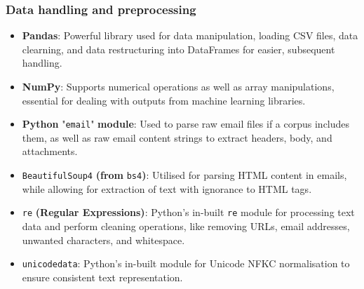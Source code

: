 
\subsubsection*{Data handling and preprocessing}

\begin{itemize}
  \item \textbf{Pandas}: Powerful library used for data manipulation, loading CSV files, data clearning, and data restructuring into DataFrames for easier, subsequent handling.
  \item \textbf{NumPy}: Supports numerical operations as well as array manipulations, essential for dealing with outputs from machine learning libraries.
  \item \textbf{Python} "\texttt{email}" \textbf{module}: Used to parse raw email files if a corpus includes them, as well as raw email content strings to extract headers, body, and attachments.
  \item \texttt{BeautifulSoup4} \textbf{(from} \texttt{bs4}\textbf{)}: Utilised for parsing HTML content in emails, while allowing for extraction of text with ignorance to HTML tags.
  \item \texttt{re} \textbf{(Regular Expressions)}: Python's in-built \texttt{re} module for processing text data and perform cleaning operations, like removing URLs, email addresses, unwanted characters, and whitespace.
  \item \texttt{unicodedata}: Python's in-built module for Unicode NFKC normalisation to ensure consistent text representation.
\end{itemize}
